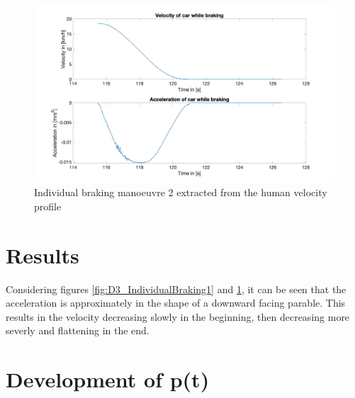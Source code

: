\begin{figure}[H]
\centering
\includegraphics[width=1\textwidth]{images/D3_example2.jpg}
\caption{Individual braking manoeuvre 2 extracted from the human velocity profile}
\label{fig:D3_IndividualBraking2}
\end{figure}

\section{Results}
Considering figures \ref{fig:D3_IndividualBraking1} and \ref{fig:D3_IndividualBraking2}, it can be seen that the acceleration is approximately in the shape of a downward facing parable. This results in the velocity decreasing slowly in the beginning, then decreasing more severly and flattening in the end.   

%
%
%

\section{Development of p(t)}\label{sec:D3_dev_pt}

